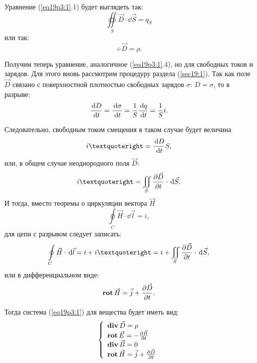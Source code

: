 	Уравнение (\ref{eq19p3:1}.1) будет выглядеть так:
	\[
        \oiint\limits_S \vec{D}\cdot\dd\vec{S} = q_S
    \]
	или так:
	\[
        \div\vec{D} = \rho.
    \]

	Получим теперь уравнение, аналогичное (\ref{eq19p3:1}.4), но для свободных
    токов и зарядов. Для этого вновь рассмотрим процедуру раздела
    (\ref{sec19:1}). Так как поле \( \vec{D} \) связано с поверхностной
    плотностью свободных зарядов \( \sigma \): \( D = \sigma \), то в разрыве:
	\[
        \frac{\,\mathrm{d} D}{\,\mathrm{d} t} = \frac{\,\mathrm{d} \sigma}{\,\mathrm{d} t} = \frac{1}{S}\frac{\,\mathrm{d} q}{\,\mathrm{d} t} =
        \frac{1}{S}i.
    \]
	
	Следовательно, свободным током смещения в таком случае будет величина
	\[
        i’ = \simpder{D}{t}S,
    \]
	или, в общем случае неоднородного поля \( \vec{D} \):
	\[
        i’ = \iint\limits_S \partder{\vec{D}}{t}\cdot\dd\vec{S}.
    \]
	И тогда, вместо теоремы о циркуляции вектора \( \vec{H} \)
    \[
        \oint\limits_C \vec{H}\cdot\dd\vec{l} = i,
    \]
    для цепи с разрывом следует записать:
	\[
        \oint\limits_C \vec{H}\cdot\dd\vec{l} = i + i’ =
        i + \iint\limits_S \partder{\vec{D}}{t}\cdot\dd\vec{S},
    \]
	или в дифференциальном виде:
	\[
        \mathbf{rot\,}\vec{H} = \vec{j} + \frac{\partial \vec{D}}{\partial t}.
    \]
	
	Тогда система (\ref{eq19p3:1}) для вещества будет иметь вид:
	\begin{equation} 
        \left\{
        \begin{array}{l}
            \mathbf{div\,}\vec{D} = \rho \\
            \mathbf{rot\,}\vec{E} = -\frac{\partial \vec{B}}{\partial t} \\
            \mathbf{div\,}\vec{B} = 0 \\
            \mathbf{rot\,}\vec{H} = \vec{j} + \frac{\partial \vec{D}}{\partial t}
        \end{array}
        \right.
        \label{eq19p3:2}
    \end{equation}
	
